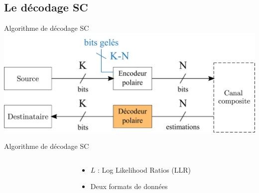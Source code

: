 \documentclass[t,compress,mathserif,12pt,xcolor=dvipsnames]{beamer}
\begin{document}
\subsection{Le décodage SC}

\begin{frame}[c]{Algorithme de décodage SC}
	\includegraphics[width=.8\textwidth]{fig/decoder_in_chain.pdf}
\end{frame}

\begin{frame}[c]{Algorithme de décodage SC}
	\begin{columns}[T] %
		\begin{column}{.65\textwidth}
		\end{column}
		\begin{column}{.35\textwidth}
		\begin{itemize}
			\item<1-> $L$ : Log Likelihood Ratios (LLR)
			\item<2-> Deux formats de données
		\end{itemize}
		\end{column}
	\end{columns}

\end{frame}
\end{document}
